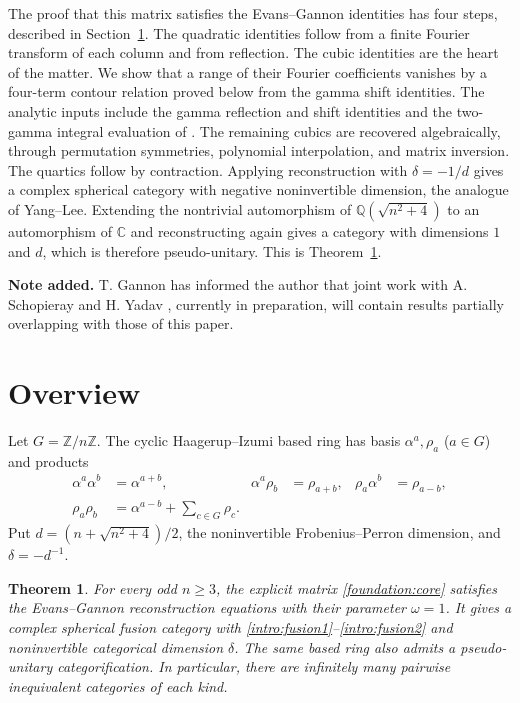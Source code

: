 \documentclass[11pt]{article}
\numberwithin{equation}{section}
\newtheorem{theorem}{Theorem}[section]
\theoremstyle{definition}
\theoremstyle{remark}
\newcommand{\Z}{\mathbb Z}
\newcommand{\Q}{\mathbb Q}
\newcommand{\C}{\mathbb C}
\begin{document}
The proof that this matrix satisfies the Evans--Gannon identities has
four steps, described in Section~\ref{sec:overview}. The quadratic
identities follow from a finite Fourier transform of each column and
from reflection. The cubic identities are the heart of the matter.
We show that a range of their Fourier coefficients vanishes by a
four-term contour relation proved below from the gamma shift identities.
The analytic inputs include the gamma reflection and shift identities
and the two-gamma integral evaluation of \cite{BSS}. The remaining cubics
are recovered algebraically, through permutation symmetries, polynomial
interpolation, and matrix inversion. The quartics follow by contraction.
Applying reconstruction with $\delta=-1/d$ gives a complex spherical
category with negative noninvertible dimension, the analogue of
Yang--Lee. Extending the nontrivial automorphism of $\Q(\sqrt{n^2+4})$
to an automorphism of $\C$ and reconstructing again gives a category with
dimensions $1$ and $d$, which is therefore pseudo-unitary. This is
Theorem~\ref{intro:main}.



\medskip
\noindent\textbf{Note added.}
T. Gannon has informed the author that joint work with A. Schopieray
and H. Yadav \cite{GSY1}, currently in preparation, will contain results
partially overlapping with those of this paper.

\section{Overview}
\label{sec:overview}

Let $G=\Z/n\Z$. The cyclic Haagerup--Izumi based ring has basis
$\alpha^a,\rho_a$ ($a\in G$) and products
\begin{align}
 \alpha^a\alpha^b&=\alpha^{a+b}, &
 \alpha^a\rho_b&=\rho_{a+b}, &
 \rho_a\alpha^b&=\rho_{a-b},\label{intro:fusion1}\\
 \rho_a\rho_b&=\alpha^{a-b}+\sum_{c\in G}\rho_c.
 \label{intro:fusion2}
\end{align}
Put $d=(n+\sqrt{n^2+4})/2$, the noninvertible
Frobenius--Perron dimension, and $\delta=-d^{-1}$.

\begin{theorem}\label{intro:main}
For every odd $n\ge3$, the explicit matrix \eqref{foundation:core}
satisfies the Evans--Gannon reconstruction equations
\cite[Eqs.~(4.7)--(4.10)]{EG} with their parameter $\omega=1$.
It gives a complex spherical fusion category with
\eqref{intro:fusion1}--\eqref{intro:fusion2} and noninvertible
categorical dimension $\delta$. The same based ring also admits a
pseudo-unitary categorification. In particular, there are infinitely
many pairwise inequivalent categories of each kind.
\end{theorem}
\end{document}
